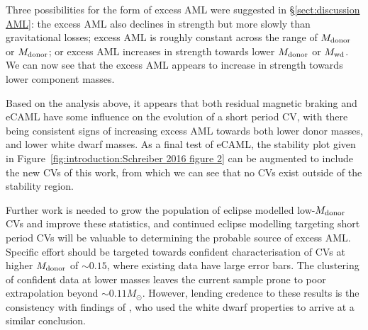 Three possibilities for the form of excess AML were suggested in \S\ref{sect:discussion AML}: the excess AML also declines in strength but more slowly than gravitational losses; excess AML is roughly constant across the range of $M_{\rm donor}$ or $M_{\rm donor}$; or excess AML increases in strength towards lower $M_{\rm donor}$ or $M_{\rm wd}$.
We can now see that the excess AML appears to increase in strength towards lower component masses.

Based on the analysis above, it appears that both residual magnetic braking and eCAML have some influence on the evolution of a short period CV, with there being consistent signs of increasing excess AML towards both lower donor masses, and lower white dwarf masses.
As a final test of eCAML, the stability plot given in Figure~\ref{fig:introduction:Schreiber 2016 figure 2} can be augmented to include the new CVs of this work, from which we can see that no CVs exist outside of the stability region.

Further work is needed to grow the population of eclipse modelled low-$M_{\rm donor}$ CVs and improve these statistics, and continued eclipse modelling targeting short period CVs will be valuable to determining the probable source of excess AML.
Specific effort should be targeted towards confident characterisation of CVs at higher $M_{\rm donor}$ of $\sim0.15$, where existing data have large error bars. The clustering of confident data at lower masses leaves the current sample prone to poor extrapolation beyond $\sim 0.11 M_\odot$.
However, lending credence to these results is the consistency with findings of \citet{Pala2021}, who used the white dwarf properties to arrive at a similar conclusion.

